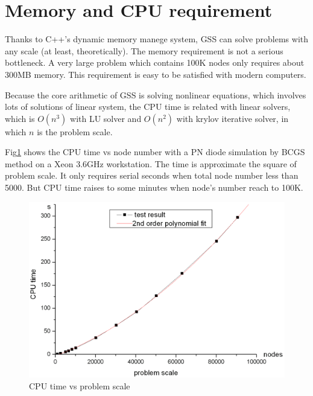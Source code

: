 \documentclass[11pt,pdftex]{article}
\begin{document}
\section{Memory and CPU requirement}
Thanks to C++'s dynamic memory manege system, GSS can solve problems
with any scale (at least, theoretically). The memory requirement is
not a serious bottleneck. A very large problem which contains 100K
nodes only requires about 300MB memory. This requirement is easy to
be satisfied with modern computers.

Because the core arithmetic of GSS is solving nonlinear equations,
which involves lots of solutions of linear system, the CPU time is
related with linear solvers, which is $O(n^3)$ with LU solver and
$O(n^2)$ with krylov iterative solver, in which $n$ is the problem
scale.

Fig\ref{CPUTime1} shows the CPU time vs node number with a PN diode
simulation by BCGS method on a Xeon 3.6GHz workstation. The time is
approximate the square of problem scale. It only requires serial
seconds when total node number less than 5000. But CPU time raises
to some minutes when node's number reach to 100K.

\begin{figure}[tbh]
\centering
\includegraphics[scale=0.2]{CPU.png}
\caption{CPU time vs problem scale} \label{CPUTime1}
\end{figure}
\end{document}
